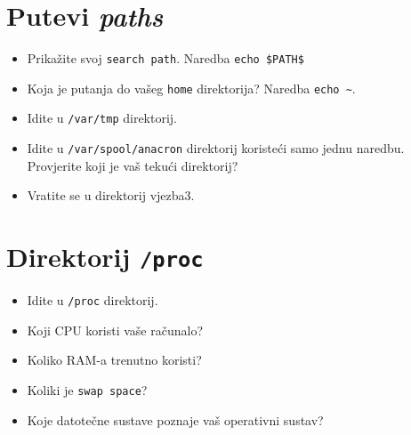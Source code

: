 \section{Putevi \textit{paths}}
\begin{itemize}
 \item Prikažite svoj \texttt{search path}. Naredba \texttt{echo \$PATH\$} 
 
 
\item Koja je putanja do vašeg \texttt{home} direktorija? Naredba \texttt{echo \~}. 
\item Idite u \texttt{/var/tmp} direktorij.
\item Idite u \texttt{/var/spool/anacron} direktorij koristeći samo jednu naredbu. Provjerite koji je vaš tekući direktorij?
\item Vratite se u direktorij vjezba3.
\end{itemize}

\section{Direktorij \texttt{/proc} }
\begin{itemize}
 \item Idite u \texttt{/proc} direktorij.
\item Koji CPU koristi vaše računalo?
\item Koliko RAM-a trenutno koristi?
\item Koliki je \texttt{swap space}?
\item Koje datotečne sustave poznaje vaš operativni sustav?
\end{itemize}

\vfill
